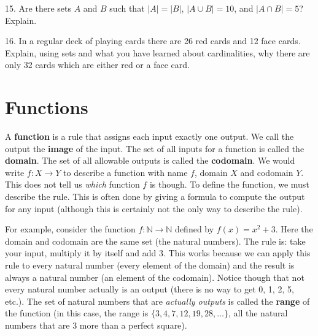 \documentclass[10pt,]{book}
\newcommand{\terminology}[1]{\textbf{#1}}
\theoremstyle{plain}
\theoremstyle{definition}
\theoremstyle{definition}
\theoremstyle{definition}
\numberwithin{equation}{chapter}
\def\N{\mathbb N}
\begin{document}
\begin{exerciselist}
\par\smallskip
\item[15.]\hypertarget{exercise-25}{}
          Are there sets \(A\) and \(B\) such that \(|A| = |B|\), \(|A\cup B| = 10\), and \(|A\cap B| = 5\)? Explain.
\par\smallskip
\item[16.]\hypertarget{exercise-26}{}
          In a regular deck of playing cards there are 26 red cards and 12 face cards. Explain, using sets and what you have learned about cardinalities, why there are only 32 cards which are either red or a face card.
\par\smallskip
\end{exerciselist}
\typeout{************************************************}
\typeout{************************************************}
\section[Functions]{Functions}\label{sec_intro-functions}
\typeout{************************************************}
\typeout{************************************************}

      A
      \terminology{function} is a rule that assigns each input exactly one output.  We call the output the \terminology{image} of the input.  The set of all inputs for a function is called the
      \terminology{domain}. The set of all allowable outputs is called the
      \terminology{codomain}. We would write \(f:X \to Y\) to describe a function with name \(f\), domain \(X\) and codomain \(Y\). This does not tell us \emph{which} function \(f\) is though. To define the function, we must describe the rule. This is often done by giving a formula to compute the output for any input (although this is certainly not the only way to describe the rule). %
\par
 For example, consider the function \(f:\N \to \N\) defined by \(f(x) = x^2 + 3\). Here the domain and codomain are the same set (the natural numbers). The rule is: take your input, multiply it by itself and add 3. This works because we can apply this rule to every natural number (every element of the domain) and the result is always a natural number (an element of the codomain). Notice though that not every natural number actually is an output (there is no way to get 0, 1, 2, 5, etc.). The set of natural numbers that are \emph{actually outputs} is called the
      \terminology{range} of the function (in this case, the range is \(\{3, 4, 7, 12, 19, 28, \ldots\}\), all the natural numbers that are 3 more than a perfect square).
\par
\end{document}
